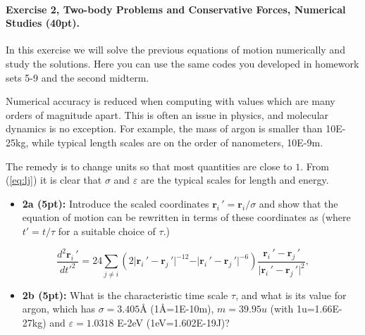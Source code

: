 \documentclass[%
oneside,                 %
final,                   %
10pt]{article}
\begin{document}
\paragraph{Exercise 2, Two-body Problems and Conservative Forces, Numerical Studies (40pt).}
In this exercise we will solve the previous equations of motion numerically and study the solutions.
Here you can use the same codes you developed in homework sets 5-9 and the second midterm.

Numerical accuracy is reduced when computing with values which are
many orders of magnitude apart. This is often an issue in physics, and
molecular dynamics is no exception. For example, the mass of argon is
smaller than 10E-25kg, while typical length scales are
on the order of nanometers, 10E-9m.

The remedy is to change units so that most quantities are close to
$1$. From (\ref{eq:lj}) it is clear that $\sigma$ and $\varepsilon$
are the typical scales for length and energy.

\begin{itemize}
\item \textbf{2a (5pt):} Introduce the scaled coordinates $\bm{r}_i\,'=\bm{r}_i/\sigma$ and show that the equation of motion can be rewritten in terms of these coordinates as (where $t'=t/\tau$ for a suitable choice of $\tau$.)
\end{itemize}

\noindent
\begin{equation}
\frac{d^2\bm{r}_i\,'}{{dt'^2}} = 24 \sum_{j \neq i} \left(2\vert\bm{r}_i\,'-\bm{r}_j\,'\vert^{-12}-\vert\bm{r}_i\,'-\bm{r}_j\,'\vert^{-6}\right)\frac{\bm{r}_i\,'-\bm{r}_j\,'}{\vert\bm{r}_i\,'-\bm{r}_j\,'\vert^2}, \label{eq:undim}
\end{equation}
\begin{itemize}
\item \textbf{2b (5pt):} What is the characteristic time scale $\tau$, and what is its value for argon, which has $\sigma=3.405$Å (1Å=1E-10m), $m = 39.95u$ (with 1u=1.66E-27kg) and $\varepsilon=1.0318$ E-2eV (1eV=1.602E-19J)?
\end{itemize}
\end{document}

